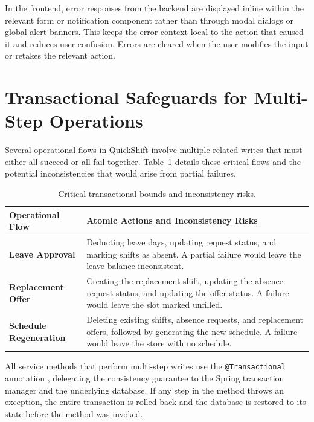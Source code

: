 \par In the frontend, error responses from the backend are displayed inline within the relevant form or notification component rather than through modal dialogs or global alert banners. This keeps the error context local to the action that caused it and reduces user confusion. Errors are cleared when the user modifies the input or retakes the relevant action.

\section{Transactional Safeguards for Multi-Step Operations}
\par Several operational flows in QuickShift involve multiple related writes that must either all succeed or all fail together. Table~\ref{tab:transactional_safeguards} details these critical flows and the potential inconsistencies that would arise from partial failures.

\begin{table}[H]
\centering
\caption{Critical transactional bounds and inconsistency risks.}
\begin{tabular}{|p{4.5cm}|p{9.5cm}|}
\hline
\textbf{Operational Flow} & \textbf{Atomic Actions and Inconsistency Risks} \\ \hline
\textbf{Leave Approval} & Deducting leave days, updating request status, and marking shifts as absent. A partial failure would leave the leave balance inconsistent. \\ \hline
\textbf{Replacement Offer} & Creating the replacement shift, updating the absence request status, and updating the offer status. A failure would leave the slot marked unfilled. \\ \hline
\textbf{Schedule Regeneration} & Deleting existing shifts, absence requests, and replacement offers, followed by generating the new schedule. A failure would leave the store with no schedule. \\ \hline
\end{tabular}
\label{tab:transactional_safeguards}
\end{table}

\par All service methods that perform multi-step writes use the \texttt{@Transactional} annotation  \cite{spring_transactional}, delegating the consistency guarantee to the Spring transaction manager and the underlying database. If any step in the method throws an exception, the entire transaction is rolled back and the database is restored to its state before the method was invoked.

